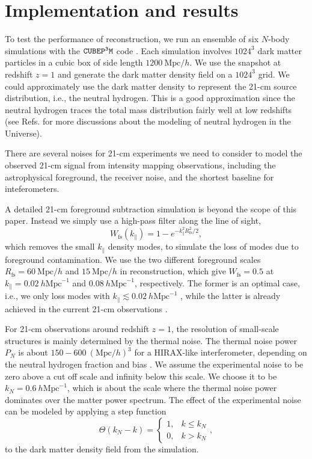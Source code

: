 \documentclass[prd,superscriptaddress,floatfix,notitlepage,nofootinbib,reprint]{revtex4-1}
\newcommand{\mr}{\mathrm}
\newcommand{\kpa}{k_\parallel}
\newcommand{\bea}{\begin{equation}}
\newcommand{\eea}{\end{equation}}
\begin{document}
\section{Implementation and results}
\label{sec:sim}

To test the performance of reconstruction, we run an ensemble of six $N$-body
simulations with the ${\tt CUBEP^3M}$ code \cite{2013CUBEP3M}. 
Each simulation involves $1024^3$ dark matter particles in a cubic box of side
length $1200\ \mr{Mpc}/h$. 
We use the snapshot at redshift $z=1$ and generate the dark matter density 
field on a $1024^3$ grid.
We could approximately use the dark matter density to represent the 21-cm 
source distribution, i.e., the neutral hydrogen.
This is a good approximation since the neutral hydrogen traces the total mass
distribution fairly well at low redshifts (see Refs. \cite{2017HI,2017Void}
for more discussions about the modeling of neutral hydrogen in the Universe).

There are several noises for 21-cm experiments we need to consider to model
the observed 21-cm signal from intensity mapping observations, including the 
astrophysical foreground, the receiver noise, and the shortest baseline for 
inteferometers.

A detailed 21-cm foreground subtraction simulation is beyond the scope of this 
paper. Instead we simply use a high-pass filter along the line of sight,
\bea
W_{\mr{fs}}(\kpa)=1-e^{-\kpa^2R_\mr{fs}^2/2},
\eea
which removes the small $\kpa$ density modes, to simulate the loss of modes due
to foreground contamination. 
We use the two different foreground scales $R_\mr{fs}=60\ \mr{Mpc}/h$ and 
$15\ \mr{Mpc}/h$ in reconstruction, which give $W_{\mr{fs}}=0.5$ at 
$\kpa=0.02\ h\mr{Mpc}^{-1}$ and $0.08\ h\mr{Mpc}^{-1}$, respectively. 
The former is an optimal case, i.e., we only loss modes with 
$\kpa\lesssim0.02\ h\mr{Mpc}^{-1}$ \cite{2015FG}, while the latter is already 
achieved in the current 21-cm observations \cite{2013IM,2013IM2}.

For 21-cm observations around redshift $z=1$, the resolution of small-scale
structures is mainly determined by the thermal noise.
The thermal noise power $P_N$ is about $150-600\ (\mr{Mpc}/h)^3$ for a 
HIRAX-like interferometer, depending on the neutral hydrogen fraction and bias
\cite{2017Void}.
We assume the experimental noise to be zero above a cut off scale and infinity 
below this scale.
We choose it to be $k_N=0.6\ h\mr{Mpc}^{-1}$, which is about the scale 
where the thermal noise power dominates over the matter power spectrum.
The effect of the experimental noise can be modeled by applying a step function
\begin{displaymath}
\Theta(k_N-k)=\left\{
    \begin{array}{ll}
        1,& k\leq k_N  \\
        0,& k> k_N
    \end{array}\right.,
\end{displaymath}
to the dark matter density field from the simulation.
\end{document}
